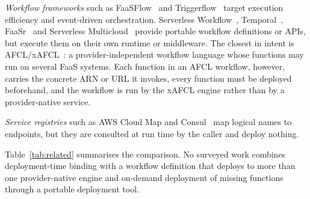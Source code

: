 \documentclass[conference]{IEEEtran}
\begin{document}
\emph{Workflow frameworks} such as FaaSFlow~\cite{li2022faasflow} and
Triggerflow~\cite{garciaLopez2020triggerflow} target execution efficiency and event-driven
orchestration. Serverless Workflow~\cite{serverlessWorkflowSpec}, Temporal~\cite{temporalPlatform},
FaaSr~\cite{park2024faasr} and Serverless Multicloud~\cite{zhao2022supporting} provide portable
workflow definitions or APIs, but execute them on their own runtime or middleware. The closest in
intent is AFCL/xAFCL~\cite{ristov2021afcl,ristov2023xafcl}: a provider-independent workflow
language whose functions may run on several FaaS systems. Each function in an AFCL workflow,
however, carries the concrete ARN or URL it invokes, every function must be deployed beforehand,
and the workflow is run by the xAFCL engine rather than by a provider-native service.

\emph{Service registries} such as AWS Cloud Map and Consul~\cite{awsCloudMap,consulServiceDiscovery}
map logical names to endpoints, but they are consulted at run time by the caller and deploy nothing.

Table~\ref{tab:related} summarises the comparison. No surveyed work combines deployment-time
binding with a workflow definition that deploys to more than one provider-native engine and
on-demand deployment of missing functions through a portable deployment tool.
\end{document}
